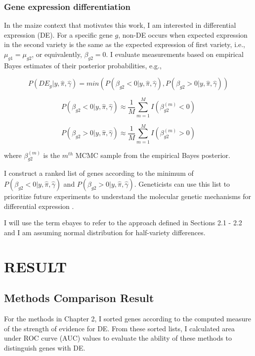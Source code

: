 \subsection{Gene expression differentiation}

In the maize context that motivates this work, I am interested in differential expression (DE). For a specific gene $g$, non-DE occurs when expected expression in the second variety is the same as the expected expression of first variety, i.e., $\mu_{g1} = \mu_{g2}$, or equivalently, $\beta_{g2}=0$.  I evaluate measurements based on empirical Bayes estimates of their posterior probabilities, e.g., 

\begin{equation}
\label{eq:6}
P(DE_g | y, \hat{\pi}, \hat{\gamma}) =min( P(\beta_{g2}< 0 | y, \hat{\pi}, \hat{\gamma}),  P(\beta_{g2}> 0 | y, \hat{\pi}, \hat{\gamma}))
\end{equation}

$$P(\beta_{g2}< 0 | y, \hat{\pi}, \hat{\gamma}) \approx \frac{1}{M} \sum_{m=1}^M I(\beta_{g2} ^ {(m)} < 0)$$

$$P(\beta_{g2}> 0 | y, \hat{\pi}, \hat{\gamma}) \approx \frac{1}{M} \sum_{m=1}^M I(\beta_{g2} ^ {(m)} > 0) $$

where $\beta_{g2}^{(m)}$ is the $m^{th}$ MCMC sample from the empirical Bayes posterior.



I construct a ranked list of genes according to the minimum of $P(\beta_{g2}< 0 | y, \hat{\pi}, \hat{\gamma})$ and $P(\beta_{g2}> 0 | y, \hat{\pi}, \hat{\gamma})$. Geneticists can use this list to prioritize future experiments to understand the molecular genetic mechanisms for differential expression \citep{niemi2015empirical}. 

I will use the term ebayes to refer to the approach defined in Sections 2.1 - 2.2 and I am assuming normal distribution for half-variety differences.





\chapter{RESULT}

\section{Methods Comparison Result}

For the methods in Chapter 2, I sorted genes according to the computed measure of the strength of evidence for DE. From these sorted lists, I calculated area under ROC curve (AUC) values to evaluate the ability of these methods to distinguish genes with DE. 

